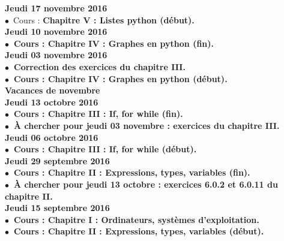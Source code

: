 \documentclass[12pt,a4paper]{article}
\begin{document}
\noindent\textbf{\bf Jeudi 17 novembre 2016 \rm}\\
$\bullet$\ Cours : \bf Chapitre V \rm : Listes python (début).\vspace{.4cm}\\

\noindent\textbf{\bf Jeudi 10 novembre 2016 \rm}\\
$\bullet$\ Cours : \bf Chapitre IV \rm : Graphes en python (fin).\vspace{.4cm}\\

\noindent\textbf{\bf Jeudi 03 novembre 2016 \rm}\\
$\bullet$\ Correction des exercices du chapitre III.\\
$\bullet$\ Cours : \bf Chapitre IV \rm : Graphes en python (début).\vspace{.4cm}\\

\noindent\textbf{ Vacances de novembre }\vspace{.4cm}\\

\noindent\textbf{\bf Jeudi 13 octobre 2016 \rm}\\
$\bullet$\ Cours : \bf Chapitre III \rm : If, for while (fin).\\
$\bullet$\ À chercher pour jeudi 03 novembre : exercices du chapitre III.\vspace{.4cm}\\
  
\noindent\textbf{\bf Jeudi 06 octobre 2016 \rm}\\
$\bullet$\ Cours : \bf Chapitre III \rm : If, for while (début).\vspace{.4cm}\\
  
\noindent\textbf{\bf Jeudi 29 septembre 2016 \rm}\\
$\bullet$\ Cours :  \bf Chapitre II \rm : Expressions, types, variables (fin).\\
$\bullet$\ À chercher pour jeudi 13 octobre : exercices 6.0.2 et 6.0.11 du chapitre 
II.\vspace{.4cm}\\

\noindent\textbf{\bf Jeudi 15 septembre 2016 \rm}\\
$\bullet$\ Cours :  \bf Chapitre I \rm : Ordinateurs, systèmes d'exploitation.\vspace{.4cm}\\
$\bullet$\ Cours :  \bf Chapitre II \rm : Expressions, types, variables (début).\vspace{.4cm}\\


\label{end}
\end{document}
